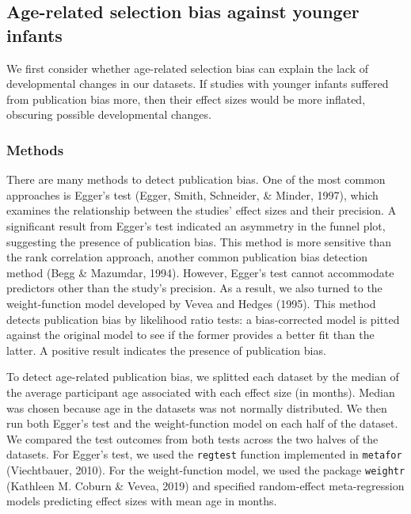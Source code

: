 \documentclass[
  man]{apa6}
\begin{document}
\hypertarget{age-related-selection-bias-against-younger-infants}{%
\subsection{Age-related selection bias against younger infants}\label{age-related-selection-bias-against-younger-infants}}

We first consider whether age-related selection bias can explain the lack of developmental changes in our datasets. If studies with younger infants suffered from publication bias more, then their effect sizes would be more inflated, obscuring possible developmental changes.

\hypertarget{methods-1}{%
\subsubsection{Methods}\label{methods-1}}

There are many methods to detect publication bias. One of the most common approaches is Egger's test (Egger, Smith, Schneider, \& Minder, 1997), which examines the relationship between the studies' effect sizes and their precision. A significant result from Egger's test indicated an asymmetry in the funnel plot, suggesting the presence of publication bias. This method is more sensitive than the rank correlation approach, another common publication bias detection method (Begg \& Mazumdar, 1994). However, Egger's test cannot accommodate predictors other than the study's precision. As a result, we also turned to the weight-function model developed by Vevea and Hedges (1995). This method detects publication bias by likelihood ratio tests: a bias-corrected model is pitted against the original model to see if the former provides a better fit than the latter. A positive result indicates the presence of publication bias.

To detect age-related publication bias, we splitted each dataset by the median of the average participant age associated with each effect size (in months). Median was chosen because age in the datasets was not normally distributed. We then run both Egger's test and the weight-function model on each half of the dataset. We compared the test outcomes from both tests across the two halves of the datasets. For Egger's test, we used the \texttt{regtest} function implemented in \texttt{metafor} (Viechtbauer, 2010). For the weight-function model, we used the package \texttt{weightr} (Kathleen M. Coburn \& Vevea, 2019) and specified random-effect meta-regression models predicting effect sizes with mean age in months.
\end{document}
